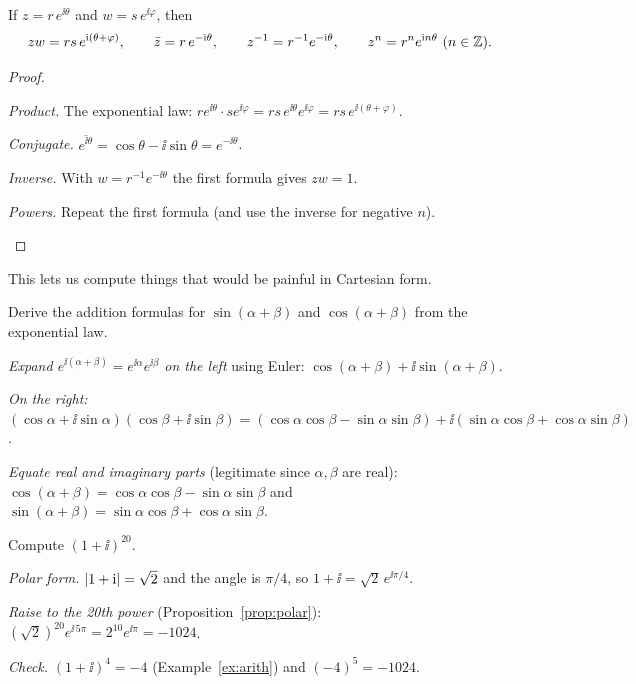 \begin{proposition}\label{prop:polar}
  If $z=r\,e^{\ii\theta}$ and $w=s\,e^{\ii\varphi}$, then
  \[
    zw=rs\,e^{\mathrm{i}(\theta+\varphi)},\qquad \bar z=r\,e^{-\mathrm{i}\theta},\qquad z^{-1}=r^{-1}e^{-\mathrm{i}\theta},\qquad z^n=r^n e^{\mathrm{i} n\theta}\ (n\in\mathbb{Z}).
  \]
\end{proposition}
\begin{proof}
  \begin{steps}
    \item \emph{Product.} The exponential law: $re^{\ii\theta}\cdot se^{\ii\varphi}=rs\,e^{\ii\theta}e^{\ii\varphi}=rs\,e^{\ii(\theta+\varphi)}$.
    \item \emph{Conjugate.} $\overline{e^{\ii\theta}}=\cos\theta-\ii\sin\theta=e^{-\ii\theta}$.
    \item \emph{Inverse.} With $w=r^{-1}e^{-\ii\theta}$ the first formula gives $zw=1$.
    \item \emph{Powers.} Repeat the first formula (and use the inverse for negative $n$). \qedhere
  \end{steps}
\end{proof}

This lets us compute things that would be painful in Cartesian form.

\begin{example}\label{ex:trig}
  Derive the addition formulas for $\sin(\alpha+\beta)$ and $\cos(\alpha+\beta)$ from the exponential law.
\end{example}
\begin{solution}
  \begin{steps}
    \item \emph{Expand $e^{\ii(\alpha+\beta)}=e^{\ii\alpha}e^{\ii\beta}$ on the left} using Euler: $\cos(\alpha+\beta)+\ii\sin(\alpha+\beta)$.
    \item \emph{On the right:} $(\cos\alpha+\ii\sin\alpha)(\cos\beta+\ii\sin\beta)=(\cos\alpha\cos\beta-\sin\alpha\sin\beta)+\ii(\sin\alpha\cos\beta+\cos\alpha\sin\beta)$.
    \item \emph{Equate real and imaginary parts} (legitimate since $\alpha,\beta$ are real): $\cos(\alpha+\beta)=\cos\alpha\cos\beta-\sin\alpha\sin\beta$ and $\sin(\alpha+\beta)=\sin\alpha\cos\beta+\cos\alpha\sin\beta$.
  \end{steps}
\end{solution}

\begin{example}\label{ex:power}
  Compute $(1+\ii)^{20}$.
\end{example}
\begin{solution}
  \begin{steps}
    \item \emph{Polar form.} $\left|1+\mathrm{i}\right|=\sqrt2$ and the angle is $\pi/4$, so $1+\ii=\sqrt2\,e^{\ii\pi/4}$.
    \item \emph{Raise to the 20th power} (Proposition~\ref{prop:polar}): $(\sqrt2)^{20}e^{\ii\,5\pi}=2^{10}e^{\ii\pi}=-1024$.
    \item \emph{Check.} $(1+\ii)^4=-4$ (Example~\ref{ex:arith}) and $(-4)^5=-1024$.
  \end{steps}
\end{solution}

